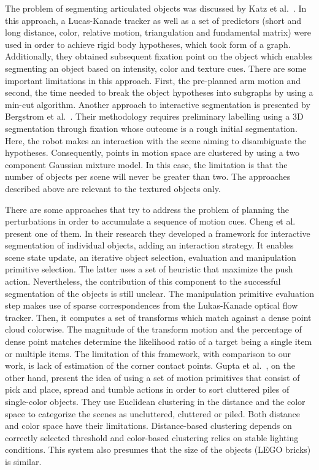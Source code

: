 The problem of segmenting articulated objects was discussed by Katz et al.~\cite{Katz-WS-MM-ICRA2011}. In this approach, a Lucas-Kanade tracker as well as a set of predictors (short and long distance, color, relative motion, triangulation and fundamental matrix) were used in order to achieve rigid body hypotheses, which took form of a graph. Additionally, they obtained subsequent fixation point on the object which enables segmenting an object based on intensity, color and texture cues. There are some important limitations in this approach. First, the pre-planned arm motion and second, the time needed to break the object hypotheses into subgraphs by using a min-cut algorithm. 
Another approach to interactive segmentation is presented by Bergstrom et al.~\cite{bergstrom11icvs}. Their methodology requires preliminary labelling using a 3D segmentation through fixation whose outcome is a rough initial segmentation. Here, the robot makes an interaction with the scene aiming to disambiguate the hypotheses. Consequently, points in motion space are clustered by using a two component Gaussian mixture model. In this case, the limitation is that the number of objects per scene will never be greater than two.
The approaches described above are relevant to the textured objects only. 

There are some approaches that try to address the problem of planning the perturbations in order to accumulate a sequence of motion cues. Cheng et al.~\cite{chang11interactive} present one of them. In their research they developed a framework for interactive segmentation of individual objects, adding an interaction strategy. It enables scene state update, an iterative object selection, evaluation and manipulation primitive selection. The latter uses a set of heuristic that maximize the push action. Nevertheless, the contribution of this component to the successful segmentation of the objects is still unclear. The manipulation primitive evaluation step makes use of sparse correspondences from the Lukas-Kanade optical flow tracker. Then, it computes a set of transforms which match against a dense point cloud colorwise. The magnitude of the transform motion and the percentage of dense point matches determine the likelihood ratio of a target being a single item or multiple items. The limitation of this framework, with comparison to our work, is lack of estimation of the corner contact points.
Gupta et al.~\cite{gupta11primitives}, on the other hand, present the idea of using a set of motion primitives that consist of pick and place, spread and tumble actions in order to sort cluttered piles of single-color objects. They use Euclidean clustering in the distance and the color space to categorize the scenes as uncluttered, cluttered or piled. Both distance and color space have their limitations. Distance-based clustering depends on correctly selected threshold and color-based clustering relies on stable lighting conditions. This system also presumes that the size of the objects (LEGO bricks) is similar. 


